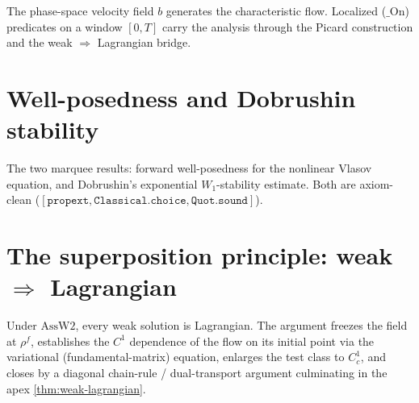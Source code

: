 The phase-space velocity field $b$ generates the characteristic flow.  Localized ($\_\mathrm{On}$)
predicates on a window $[0,T]$ carry the analysis through the Picard construction and the
weak $\Rightarrow$ Lagrangian bridge.


\chapter{Well-posedness and Dobrushin stability}

The two marquee results: forward well-posedness for the nonlinear Vlasov equation, and
Dobrushin's exponential $W_1$-stability estimate.  Both are axiom-clean
($[\mathtt{propext}, \mathtt{Classical.choice}, \mathtt{Quot.sound}]$).


\chapter[The superposition principle: weak implies Lagrangian]{The superposition principle: weak $\Rightarrow$ Lagrangian}

Under $\mathrm{AssW2}$, every weak solution is Lagrangian.  The argument freezes the field at
$\rho^f$, establishes the $C^1$ dependence of the flow on its initial point via the variational
(fundamental-matrix) equation, enlarges the test class to $C^1_c$, and closes by a diagonal
chain-rule / dual-transport argument culminating in the apex
\cref{thm:weak-lagrangian}.

